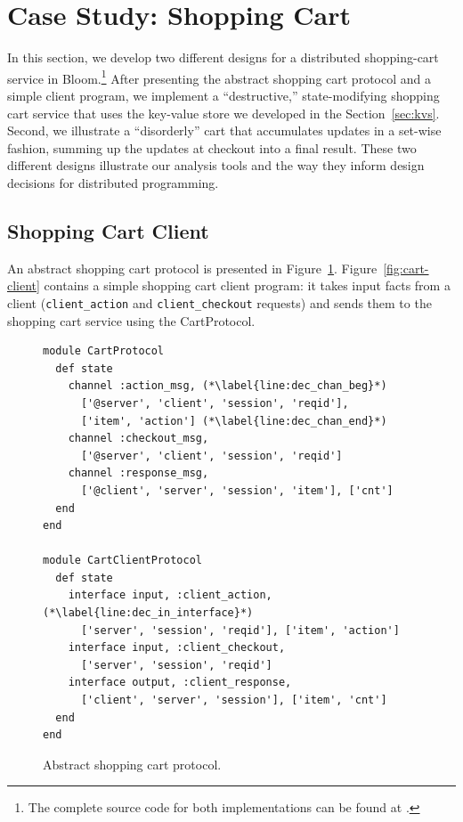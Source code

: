 \section{Case Study: Shopping Cart}
\label{sec:case}
In this section, we develop two different designs for a distributed
shopping-cart service in Bloom.\footnote{The complete source code for both
  implementations can be found at
  .}  After
presenting the abstract shopping cart protocol and a simple client program, we
implement a ``destructive,'' state-modifying shopping cart service that uses the
key-value store we developed in the Section~\ref{sec:kvs}. Second, we illustrate
a ``disorderly'' cart that accumulates updates in a set-wise fashion, summing up
the updates at checkout into a final result.  These two different designs
illustrate our analysis tools and the way they inform design decisions for
distributed programming.

\subsection{Shopping Cart Client}
An abstract shopping cart protocol is presented in
Figure~\ref{fig:declarations}. Figure~\ref{fig:cart-client} contains a simple
shopping cart client program: it takes input facts from a client
(\texttt{client\_action} and \texttt{client\_checkout} requests) and sends them
to the shopping cart service using the CartProtocol.

\begin{figure}[t]
\begin{scriptsize}
\begin{lstlisting}
module CartProtocol
  def state
    channel :action_msg, (*\label{line:dec_chan_beg}*)
      ['@server', 'client', 'session', 'reqid'],
      ['item', 'action'] (*\label{line:dec_chan_end}*)
    channel :checkout_msg,
      ['@server', 'client', 'session', 'reqid']
    channel :response_msg,
      ['@client', 'server', 'session', 'item'], ['cnt']
  end
end

module CartClientProtocol
  def state
    interface input, :client_action, (*\label{line:dec_in_interface}*)
      ['server', 'session', 'reqid'], ['item', 'action'] 
    interface input, :client_checkout,
      ['server', 'session', 'reqid']
    interface output, :client_response, 
      ['client', 'server', 'session'], ['item', 'cnt']
  end
end
\end{lstlisting}
\vspace{-10pt}
\caption{Abstract shopping cart protocol.}
\label{fig:declarations}
\end{scriptsize}
\vspace{-2pt}
\end{figure}


